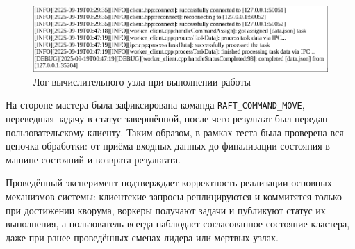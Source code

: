 \begin{figure}[h!]
    \centering
    \includegraphics[width=0.8\linewidth]{inc/worker-log-task.png}
    \caption{Лог вычислительного узла при выполнении работы}
    \label{fig:worker-log-task}
\end{figure}

На стороне мастера была зафиксирована команда \texttt{RAFT\_COMMAND\_MOVE},
переведшая задачу в статус завершённой, после чего результат был передан
пользовательскому клиенту. Таким образом, в рамках теста была проверена вся
цепочка обработки: от приёма входных данных до финализации состояния в машине
состояний и возврата результата.

Проведённый эксперимент подтверждает корректность реализации основных
механизмов системы: клиентские запросы реплицируются и коммитятся только при
достижении кворума, воркеры получают задачи и публикуют статус их выполнения,
а пользователь всегда наблюдает согласованное состояние кластера, даже при
ранее проведённых сменах лидера или мертвых узлах.
